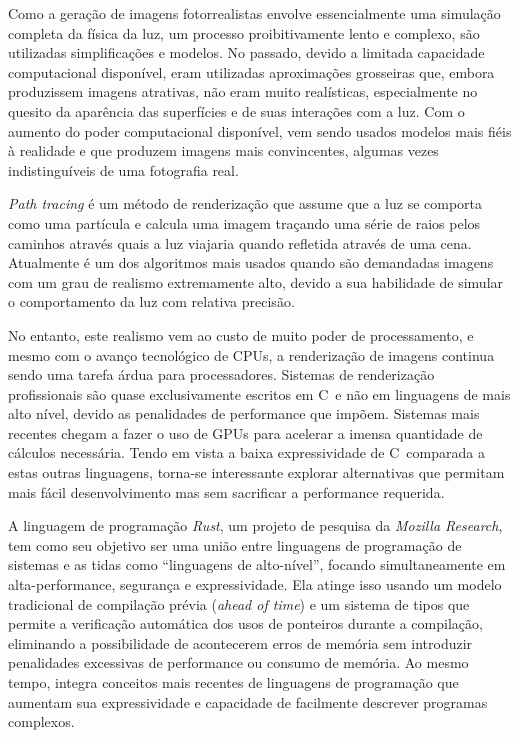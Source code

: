\documentclass[12pt]{article}
\def\Cpp{{C\nolinebreak[4]\raisebox{.20ex}{\small\bf++}}}
\begin{document}
Como a geração de imagens fotorrealistas envolve essencialmente uma simulação completa da física da
luz, um processo proibitivamente lento e complexo, são utilizadas simplificações e modelos. No
passado, devido a limitada capacidade computacional disponível, eram utilizadas aproximações
grosseiras que, embora produzissem imagens atrativas, não eram muito realísticas, especialmente no
quesito da aparência das superfícies e de suas interações com a luz. Com o aumento do poder
computacional disponível, vem sendo usados modelos mais fiéis à realidade e que produzem imagens
mais convincentes, algumas vezes indistinguíveis de uma fotografia real.

\emph{Path tracing} é um método de renderização que assume que a luz se comporta como uma partícula
e calcula uma imagem traçando uma série de raios pelos caminhos através quais a luz viajaria quando
refletida através de uma cena. Atualmente é um dos algoritmos mais usados quando são demandadas
imagens com um grau de realismo extremamente alto, devido a sua habilidade de simular o
comportamento da luz com relativa precisão.

No entanto, este realismo vem ao custo de muito poder de processamento, e mesmo com o avanço
tecnológico de CPUs, a renderização de imagens continua sendo uma tarefa árdua para processadores.
Sistemas de renderização profissionais são quase exclusivamente escritos em \Cpp\ e não em
linguagens de mais alto nível, devido as penalidades de performance que impõem. Sistemas mais
recentes chegam a fazer o uso de GPUs para acelerar a imensa quantidade de cálculos necessária.
Tendo em vista a baixa expressividade de \Cpp\ comparada a estas outras linguagens, torna-se
interessante explorar alternativas que permitam mais fácil desenvolvimento mas sem sacrificar a
performance requerida.

A linguagem de programação \emph{Rust}, um projeto de pesquisa da \emph{Mozilla Research}, tem como
seu objetivo ser uma união entre linguagens de programação de sistemas e as tidas como ``linguagens
de alto-nível'', focando simultaneamente em alta-performance, segurança e expressividade. Ela atinge
isso usando um modelo tradicional de compilação prévia (\emph{ahead of time}) e um sistema de tipos
que permite a verificação automática dos usos de ponteiros durante a compilação, eliminando a
possibilidade de acontecerem erros de memória sem introduzir penalidades excessivas de performance
ou consumo de memória. Ao mesmo tempo, integra conceitos mais recentes de linguagens de programação
que aumentam sua expressividade e capacidade de facilmente descrever programas complexos.
\end{document}
